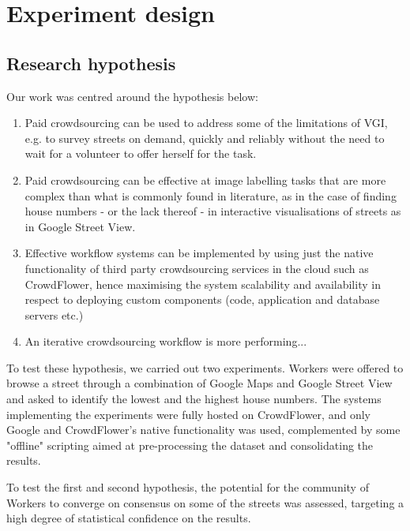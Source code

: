\section{Experiment design}

\subsection{Research hypothesis}

Our work was centred around the hypothesis below:

\begin{enumerate}

    \item Paid crowdsourcing can be used to address some of the limitations of VGI, e.g. to survey streets on demand, quickly and reliably without the need to wait for a volunteer to offer herself for the task.
    
    \item Paid crowdsourcing can be effective at image labelling tasks that are more complex than what is commonly found in literature, as in the case of finding house numbers - or the lack thereof - in interactive visualisations of streets as in Google Street View.

    \item Effective workflow systems can be implemented by using just the native functionality of third party crowdsourcing services in the cloud such as CrowdFlower, hence maximising the system scalability and availability in respect to deploying custom components (code, application and database servers etc.)

    \item An iterative crowdsourcing workflow is more performing...
    
\end{enumerate}

To test these hypothesis, we carried out two experiments. Workers were offered to browse a street through a combination of Google Maps and Google Street View and asked to identify the lowest and the highest house numbers. The systems implementing the experiments were fully hosted on CrowdFlower, and only Google and CrowdFlower's native functionality was used, complemented by some "offline" scripting aimed at pre-processing the dataset and consolidating the results.

To test the first and second hypothesis, the potential for the community of Workers to converge on consensus on some of the streets was assessed, targeting a high degree of statistical confidence on the results.

